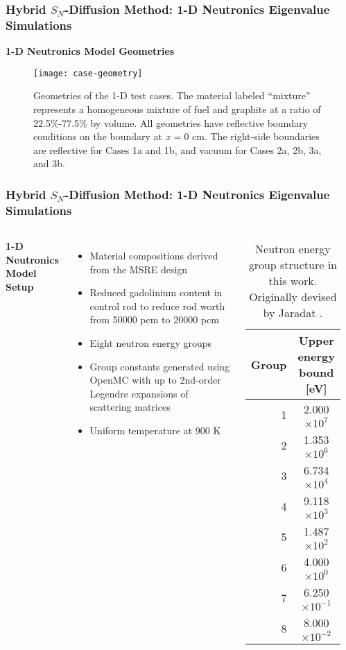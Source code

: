 \begin{frame}
  \frametitle{Hybrid $S_N$-Diffusion Method: 1-D Neutronics Eigenvalue Simulations}
  \textbf{1-D Neutronics Model Geometries}
  \begin{figure}[htb!]
    \centering
    \texttt{[image: case-geometry]}
    \caption{Geometries of the 1-D test cases. The material labeled ``mixture'' represents a
      homogeneous mixture of fuel and graphite at a ratio of 22.5\%-77.5\% by volume. All geometries
      have reflective boundary conditions on the boundary at $x=0$ cm. The right-side boundaries are
      reflective for Cases 1a and 1b, and vacuum for Cases 2a, 2b, 3a, and 3b.}
    \label{fig:case-geom}
  \end{figure}
\end{frame}

\begin{frame}
  \frametitle{Hybrid $S_N$-Diffusion Method: 1-D Neutronics Eigenvalue Simulations}
  \begin{columns}
    \column{5.5cm}
    \textbf{1-D Neutronics Model Setup}
    \vspace{.2cm}

    \begin{itemize}
      \item Material compositions derived from the MSRE design
      \item Reduced gadolinium content in control rod to reduce rod worth from 50000 pcm to 20000 pcm
      \item Eight neutron energy groups
      \item Group constants generated using OpenMC with up to 2nd-order Legendre expansions of scattering
        matrices
      \item Uniform temperature at 900 K
    \end{itemize}
    \column{5.5cm}
    \begin{table}[h]
      \centering
      \caption{Neutron energy group structure in this work. Originally devised by Jaradat
      \cite{jaradat_development_2021-1}.}
      \begin{tabular}{r S}
        \toprule
        Group & {Upper energy bound [eV]} \\
         & 2.000$\times 10^7$ \\
        2 & 1.353$\times 10^6$ \\
        3 & 6.734$\times 10^4$ \\
        4 & 9.118$\times 10^3$ \\
        5 & 1.487$\times 10^2$ \\
        6 & 4.000$\times 10^0$ \\
        7 & 6.250$\times 10^{-1}$ \\
        8 & 8.000$\times 10^{-2}$ \\
        \bottomrule
      \end{tabular}
      \label{table:energy-group}
    \end{table}
  \end{columns}
\end{frame}

